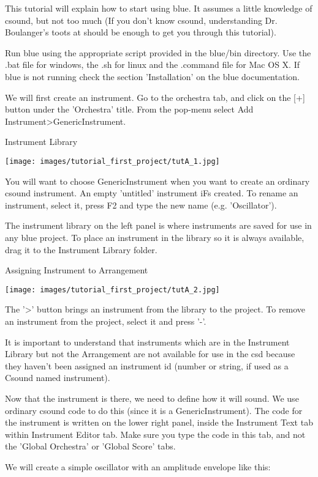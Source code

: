 This tutorial will explain how to start using blue. It assumes a little
knowledge of csound, but not too much (If you don't know csound,
understanding Dr. Boulanger's toots at
\href{http://www.csounds.com/toots/index.html}{} should be enough to get
you through this tutorial).

Run blue using the appropriate script provided in the blue/bin
directory. Use the .bat file for windows, the .sh for linux and the
.command file for Mac OS X. If blue is not running check the section
'Installation' on the blue documentation.

We will first create an instrument. Go to the orchestra tab, and click
on the {[}+{]} button under the 'Orchestra' title. From the pop-menu
select Add Instrument\textgreater{}GenericInstrument.

Instrument Library

\texttt{[image: images/tutorial\_first\_project/tutA\_1.jpg]}

You will want to choose GenericInstrument when you want to create an
ordinary csound instrument. An empty 'untitled' instrument iFs created.
To rename an instrument, select it, press F2 and type the new name (e.g.
'Oscillator').

The instrument library on the left panel is where instruments are saved
for use in any blue project. To place an instrument in the library so it
is always available, drag it to the Instrument Library folder.

Assigning Instrument to Arrangement

\texttt{[image: images/tutorial\_first\_project/tutA\_2.jpg]}

The '\textgreater{}' button brings an instrument from the library to the
project. To remove an instrument from the project, select it and press
'-'.

It is important to understand that instruments which are in the
Instrument Library but not the Arrangement are not available for use in
the csd because they haven't been assigned an instrument id (number or
string, if used as a Csound named instrument).

Now that the instrument is there, we need to define how it will sound.
We use ordinary csound code to do this (since it is a
GenericInstrument). The code for the instrument is written on the lower
right panel, inside the Instrument Text tab within Instrument Editor
tab. Make sure you type the code in this tab, and not the 'Global
Orchestra' or 'Global Score' tabs.

We will create a simple oscillator with an amplitude envelope like this:

